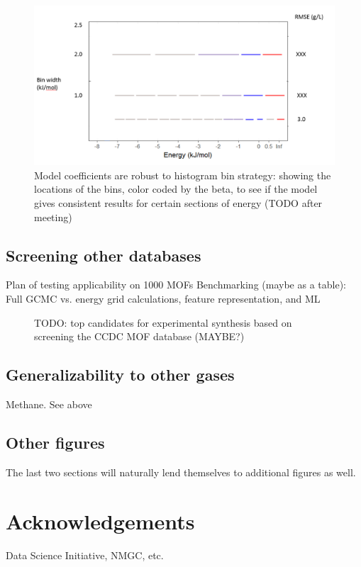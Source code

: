 \documentclass[letterpaper]{article}
\begin{document}
\begin{figure}[H]
	\centering
	\includegraphics[width=0.75\columnwidth]{Figs/beta_robustness.png}
	\caption{Model coefficients are robust to histogram bin strategy: showing the locations of the bins, color coded by the beta, to see if the model gives consistent results for certain sections of energy (TODO after meeting)}
	\label{fig:parity}
\end{figure}

\subsection{Screening other databases}
\begin{outline}
	\1 Plan of testing applicability on 1000 MOFs
	\1 Benchmarking (maybe as a table): Full GCMC vs. energy grid calculations, feature representation, and ML
\end{outline}
\begin{figure}[H]
	\centering
	\caption{TODO: top candidates for experimental synthesis based on screening the CCDC MOF database (MAYBE?)}
	\label{fig:candidates}
\end{figure}

\subsection{Generalizability to other gases}
\begin{outline}
	\1 Methane. See above
\end{outline}

\subsection{Other figures}
The last two sections will naturally lend themselves to additional figures as well.

\section{Acknowledgements}
Data Science Initiative, NMGC, etc.
\end{document}
